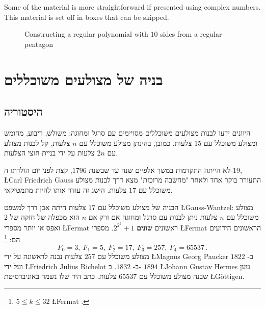 Some of the material is more straightforward if presented using complex numbers. This material is set off in boxes that can be skipped.
\begin{figure}[b]
\begin{center}
\end{center}
\caption{Constructing a regular polynomial with $10$ sides from a regular pentagon}\label{f.hept-double}
\end{figure}



\section{בניה של מצולעים משוכללים}

\subsection{היסטוריה}
היוונים ידעו לבנות מצולעים משוכללים מסויימים  עם סרגל ומחוגה: משולש, ריבוע, מחומש ומצולע משוכלל עם $15$ צלעות.
כמובן, בהינתן מצולע משוכלל עם
$n$
צלעות, קל לבנות מצולע עם 
$2n$
צלעות על ידי בניית חוצי הצלעות.

לא הייתה התקדמות במשך אלפיים שנה עד שבשנת
$1796$,
קצת לפני יום הולדתו ה-$19$,
\L{Carl Friedrich Gauss}
התעורר בוקר אחד ולאחר "מחשבה מרוכזת" מצא דרך לבנות מצולע משוכלל עם 
$17$
צלעות. הישג זה עודד אותו להיות מתמטיקאי.

הבניה של מצולע משוכלל עם 
$17$
צלעות היתה אבן דרך למשפט
\L{Gauss-Wantzel}:
מצולע משוכלל עם 
$n$
צלעות ניתן לבנות עם סרגל ומחוגה אם ורק אם 
$n$
הוא מכפלה של חזקה של
$2$
ואפס או יותר מספרי 
\L{Fermat}
ראשונים
\textbf{שונים}
$2^{2^k}+1$.
מספרי 
\L{Fermat}
הראשונים הידועים הם:%
\footnote{%
$5\leq k \leq 32$
\L{Fermat}
.}
\[
F_0=3,\: F_1=5,\: F_2=17,\: F_3=257,\: F_4=65537\,.
\]
מצולע משוכלל עם
$257$
צלעות נבנה לראשונה על ידי
\L{Magnus Georg Paucker}
ב-%
$1822$
ועל ידי
\L{Friedrich Julius Richelot}
ב-%
$1832$.
ב-%
$1894$
\L{Johann Gustav Hermes}
טען שבנה מצולע משוכלל עם
$65537$
צלעות.
כתב היד שלו נשמר באוניברסיטת 
\L{G\"{o}ttigen}.

